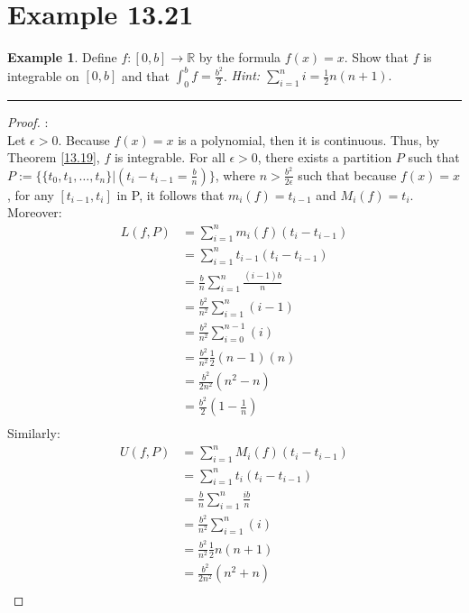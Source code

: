\documentclass[openany, amssymb, psamsfonts]{amsart}
\newcommand{\bbR}{\mathbb{R}}
\theoremstyle{definition}
\newtheorem{exmp}{Example}[section]
\numberwithin{equation}{section}
\begin{document}
\section*{Example 13.21}
\begin{exmp} 
	Define $f\colon [0, b] \to \bbR$ by the formula $f(x) = x$. Show that $f$ is integrable on $[0, b]$ and that $\int_0^b f = \frac{b^2}{2}$.
	{\em Hint: $\sum_{i=1}^n i = \frac12 n(n+1).$}
\end{exmp}

\vspace{4pt}     \hrule   \vspace{4pt}\begin{proof}:\\
    Let $\epsilon>0$. Because $f(x) = x$ is a polynomial, then it is continuous. Thus, by Theorem \ref{13.19}, $f$ is integrable. For all $\epsilon>0$, there exists a partition $P$ such that $P:=\{\{t_0, t_1, \dots, t_n\}|(t_i - t_{i-1} = \frac{b}{n})\}$, where $n>\frac{b^2}{2\epsilon}$ such that because $f(x) = x$, for any $[{t_{i-1}, t_{i}}]$ in P, it follows that $m_i(f) = t_{i-1}$ and $M_i(f) = t_i$.  Moreover:
    \begin{align*}
        L(f,P) &= \sum_{i=1}^nm_i(f)(t_i - t_{i-1})\\
               &= \sum_{i=1}^nt_{i-1}(t_i - t_{i-1})\\
               &= \frac{b}{n}\sum_{i=1}^n\frac{(i-1)b}{n}\\
               &= \frac{b^2}{n^2}\sum_{i=1}^n(i-1)\\
               &= \frac{b^2}{n^2}\sum_{i=0}^{n-1}(i)\\
               &= \frac{b^2}{n^2}\frac12 (n-1)(n)\\
               &= \frac{b^2}{2n^2}(n^2 - n)\\
               &= \frac{b^2}{2}(1- \frac{1}{n})\\
    \end{align*}
    Similarly:
    \begin{align*}
        U(f,P) &= \sum_{i=1}^nM_i(f)(t_i - t_{i-1})\\
               &= \sum_{i=1}^nt_{i}(t_i - t_{i-1})\\
               &= \frac{b}{n}\sum_{i=1}^n\frac{ib}{n}\\
               &= \frac{b^2}{n^2}\sum_{i=1}^n(i)\\
               &= \frac{b^2}{n^2}\frac12 n(n+1)\\
               &= \frac{b^2}{2n^2}(n^2 + n)\\

\end{align*}
\end{proof}
\end{document}
